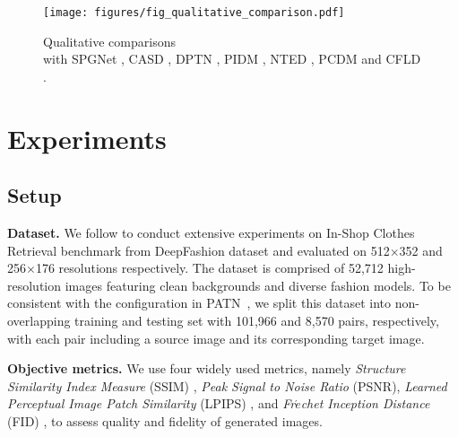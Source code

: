 \begin{figure*}
    \centering
    \texttt{[image: figures/fig\_qualitative\_comparison.pdf]}
    \caption{Qualitative comparisons \protect\\with SPGNet \cite{lv2021learning}, CASD \cite{zhou2022cross}, DPTN \cite{zhang2022exploring}, PIDM \cite{bhunia2023person}, NTED \cite{ren2022neural}, PCDM \cite{shen2024advancing} and CFLD \cite{lu2024coarse}.}
    \label{qualitative_figure}
\end{figure*}
%
\section{Experiments}
\subsection{Setup}
\textbf{Dataset.}
We follow \cite{shen2024advancing,lu2024coarse} to conduct extensive experiments on In-Shop Clothes Retrieval benchmark from DeepFashion dataset and evaluated on 512$\times$352 and 256$\times$176 resolutions respectively. 
The dataset is comprised of 52,712 high-resolution images featuring clean backgrounds and diverse fashion models. 
To be consistent with the configuration in PATN~\cite{zhu2019progressive}, we split this dataset into non-overlapping training and testing set with 101,966 and 8,570 pairs, respectively, with each pair including a source image and its corresponding target image.

\textbf{Objective metrics.}
We use four widely used metrics, namely \textit{Structure Similarity Index Measure} (SSIM) \cite{wang2004image}, \textit{Peak Signal to Noise Ratio} (PSNR), \textit{Learned Perceptual Image Patch Similarity} (LPIPS) \cite{zhang2018unreasonable}, and \textit{Fr$\acute{e}$chet Inception Distance} (FID) \cite{heusel2017gans}, to assess quality and fidelity of generated images. 

